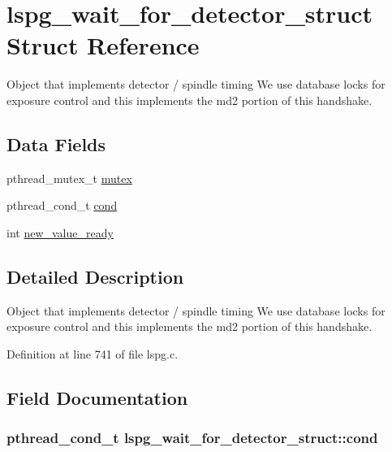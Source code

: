 \hypertarget{structlspg__wait__for__detector__struct}{\section{lspg\-\_\-wait\-\_\-for\-\_\-detector\-\_\-struct Struct Reference}
\label{structlspg__wait__for__detector__struct}
}


Object that implements detector / spindle timing We use database locks for exposure control and this implements the md2 portion of this handshake.  


\subsection*{Data Fields}
\begin{DoxyCompactItemize}
\item 
pthread\-\_\-mutex\-\_\-t \hyperlink{structlspg__wait__for__detector__struct_a958e9fe59e671e61f95c2ce796ba24ce}{mutex}
\item 
pthread\-\_\-cond\-\_\-t \hyperlink{structlspg__wait__for__detector__struct_aa97388f93ca5099196ba0da1e4a5b7bb}{cond}
\item 
int \hyperlink{structlspg__wait__for__detector__struct_ad950e85c70c4473c5c7c40f8ceeae61d}{new\-\_\-value\-\_\-ready}
\end{DoxyCompactItemize}


\subsection{Detailed Description}
Object that implements detector / spindle timing We use database locks for exposure control and this implements the md2 portion of this handshake. 

Definition at line 741 of file lspg.\-c.



\subsection{Field Documentation}
\hypertarget{structlspg__wait__for__detector__struct_aa97388f93ca5099196ba0da1e4a5b7bb}{
\subsubsection[{cond}]{\setlength{\rightskip}{0pt plus 5cm}pthread\-\_\-cond\-\_\-t lspg\-\_\-wait\-\_\-for\-\_\-detector\-\_\-struct\-::cond}}\label{structlspg__wait__for__detector__struct_aa97388f93ca5099196ba0da1e4a5b7bb}


